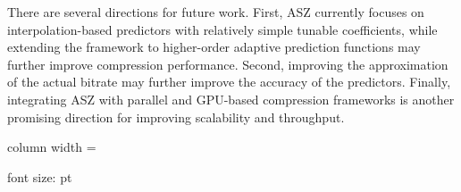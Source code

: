There are several directions for future work. First, ASZ currently focuses on interpolation-based predictors with relatively simple tunable coefficients, while extending the framework to higher-order adaptive prediction functions may further improve compression performance. 
Second, improving the approximation of the actual bitrate may further improve the accuracy of the predictors. 
Finally, integrating ASZ with parallel and GPU-based compression frameworks is another promising direction for improving scalability and throughput.


column width = \the\columnwidth

\makeatletter
font size: \f@size pt
\makeatother